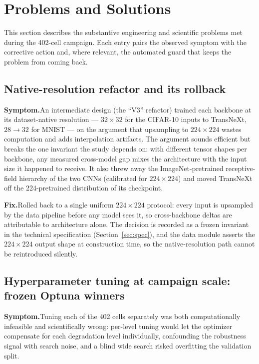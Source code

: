 \section{Problems and Solutions}
\label{sec:problems}

This section describes the substantive engineering and scientific problems
met during the 402-cell campaign. Each entry pairs the observed symptom with
the corrective action and, where relevant, the automated guard that keeps the
problem from coming back.

\subsection{Native-resolution refactor and its rollback}
\textbf{Symptom.}\quad An intermediate design (the ``V3'' refactor) trained
each backbone at its dataset-native resolution --- $32 \times 32$ for the
CIFAR-10 inputs to TransNeXt, $28 \rightarrow 32$ for MNIST --- on the
argument that upsampling to $224 \times 224$ wastes computation and adds
interpolation artifacts. The argument sounds efficient but breaks the one
invariant the study depends on: with different tensor shapes per backbone,
any measured cross-model gap mixes the architecture with the input size it
happened to receive. It also threw away the ImageNet-pretrained
receptive-field hierarchy of the two CNNs (calibrated for $224 \times 224$)
and moved TransNeXt off the 224-pretrained distribution of its checkpoint.

\textbf{Fix.}\quad Rolled back to a single uniform $224 \times 224$ protocol:
every input is upsampled by the data pipeline before any model sees it, so
cross-backbone deltas are attributable to architecture alone. The decision is
recorded as a frozen invariant in the technical specification
(Section~\ref{sec:spec}), and the data module asserts the $224 \times 224$
output shape at construction time, so the native-resolution path cannot be
reintroduced silently.

\subsection{Hyperparameter tuning at campaign scale: frozen Optuna winners}
\textbf{Symptom.}\quad Tuning each of the 402 cells separately was both
computationally infeasible and scientifically wrong: per-level tuning would
let the optimizer compensate for each degradation level individually,
confounding the robustness signal with search noise, and a blind wide search
risked overfitting the validation split.

